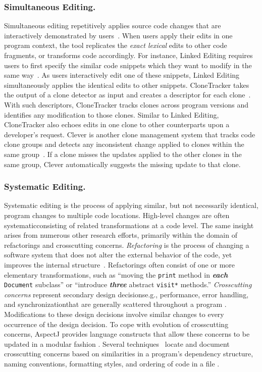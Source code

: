 \documentclass[runningheads,a4paper]{llncs}
\newcommand{\codefont}[1]{\footnotesize{\texttt{#1}}\normalsize}
\begin{document}
\subsubsection{Simultaneous Editing.}
Simultaneous editing repetitively applies source code changes that are interactively demonstrated by users~\cite{MiM2001}. When users apply their edits in one program context, the tool replicates the \emph{exact lexical} edits to other code fragments, or transforms code accordingly. For instance, Linked Editing requires users to first specify the similar code snippets which they want to modify in the same way~\cite{TBG2004}. As users interactively edit one of these snippets, Linked Editing simultaneously applies the identical edits to other snippets. 
CloneTracker takes the output of a clone detector as input and creates a descriptor for each clone~\cite{DuR2007}. With such descriptors, CloneTracker tracks clones across program versions and identifies any modification to those clones. 
Similar to Linked Editing, CloneTracker also echoes edits in one clone to other counterparts upon a developer's request. 
Clever is another clone management system that tracks code clone groups and detects any inconsistent change applied to clones within the same group~\cite{NNP2009}. If a clone misses the updates applied to the other clones in the same group, Clever automatically suggests the missing update to that clone.

\subsubsection{Systematic Editing.} 
Systematic editing is the process of applying similar, but not necessarily identical, program changes to multiple code locations. 
High-level changes are often systematic\textemdash consisting of related transformations at a code level. The same insight arises from numerous other research efforts, primarily within the domain of refactorings and crosscutting concerns. {\em Refactoring} is the process of changing a software system that does not alter the external behavior of the code, yet improves the internal structure~\cite{1999:RID,Griswold:1992,Mens2004:SSR,Opdyke1992:ROF}. Refactorings often consist of one or more elementary transformations, such as ``moving the \codefont{print} method in {\bf \em each} \codefont{Document} subclass'' or ``introduce {\bf \em three} abstract \codefont{visit*} methods.'' {\em Crosscutting concerns} represent secondary design decisions\textemdash e.g., performance, error handling, and synchronization\textemdash that are generally scattered throughout a program \cite{aspectj, Tarr1999}. Modifications to these design decisions involve similar changes to every occurrence of the design decision. To cope with evolution of crosscutting concerns, AspectJ provides language constructs that allow these concerns to be updated in a modular fashion \cite{Kiczales2001:OA}. Several techniques~\cite{Breu2006, Dagenais2007} locate and document crosscutting concerns based on similarities in a program's dependency structure, naming conventions, formatting styles, and ordering of code in a file \cite{Griswold2001}. 
\end{document}
